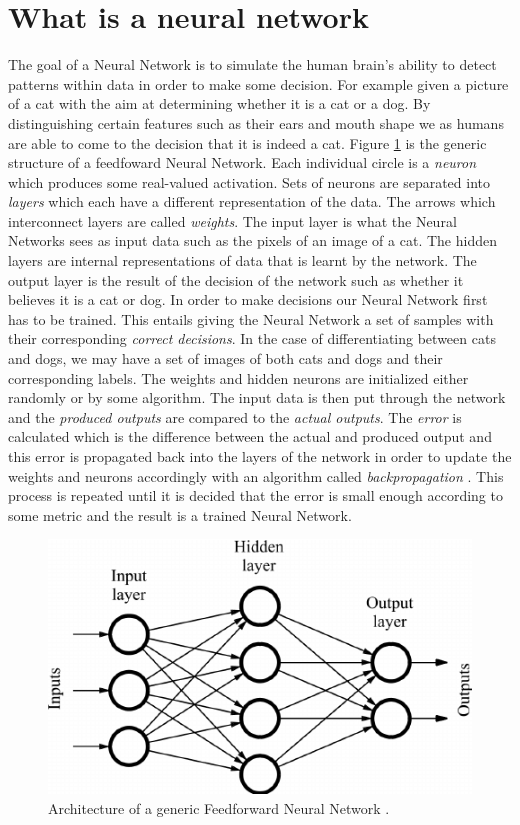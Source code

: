 \section{What is a neural network}
The goal of a Neural Network is to simulate the human brain's ability to detect patterns within data in order to make some decision. For example given a picture of a cat with the aim at determining whether it is a cat or a dog. By distinguishing certain features such as their ears and mouth shape we as humans are able to come to the decision that it is indeed a cat. Figure \ref{fig-ff-nn} is the generic structure of a feedfoward Neural Network. Each individual circle is a \emph{neuron} which produces some real-valued activation. Sets of neurons are separated into \emph{layers} which each have a different representation of the data. The arrows which interconnect layers are called \emph{weights}. The input layer is what the Neural Networks sees as input data such as the pixels of an image of a cat. The hidden layers are internal representations of data that is learnt by the network. The output layer is the result of the decision of the network such as whether it believes it is a cat or dog. In order to make decisions our Neural Network first has to be trained. This entails giving the Neural Network a set of samples with their corresponding \emph{correct decisions}. In the case of differentiating between cats and dogs, we may have a set of images of both cats and dogs and their corresponding labels. The weights and hidden neurons are initialized either randomly or by some algorithm. The input data is then put through the network and the \emph{produced outputs} are compared to the \emph{actual outputs}. The \emph{error} is calculated which is the difference between the actual and produced output and this error is propagated back into the layers of the network in order to update the weights and neurons accordingly with an algorithm called \emph{backpropagation} \cite{10.5555/65669.104451}\cite{10.5555/525960}. This process is repeated until it is decided that the error is small enough according to some metric and the result is a trained Neural Network.


\begin  {figure}[!htpb]
\centering
  \includegraphics[width=0.9\linewidth]{Credit_Images/Sample-of-a-feed-forward-neural-network.png}
   \caption{Architecture of a generic Feedforward Neural Network \cite{inbook}.}
    \label{fig-ff-nn}
\end{figure}

